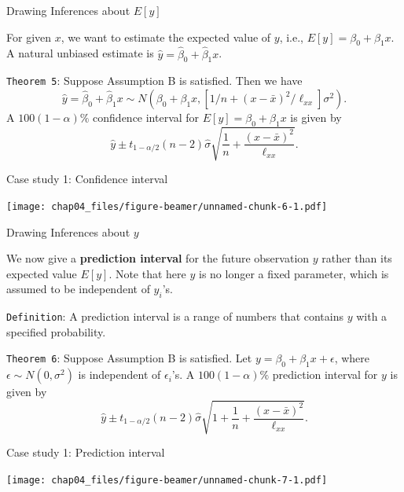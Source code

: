 \documentclass[ignorenonframetext,]{beamer}
\begin{document}
\begin{frame}[fragile]{Drawing Inferences about \(E[y]\)}
\protect\hypertarget{drawing-inferences-about-ey}{}

For given \(x\), we want to estimate the expected value of \(y\), i.e.,
\(E[y]=\beta_0+\beta_1x.\) A natural unbiased estimate is
\(\hat y = \hat\beta_0+\hat\beta_1x\).

\texttt{Theorem\ 5}: Suppose Assumption B is satisfied. Then we have
\[\hat y = \hat\beta_0+\hat\beta_1x \sim N(\beta_0+\beta_1x,[1/n+(x-\bar x)^2/\ell_{xx}]\sigma^2).\]
A \(100(1−\alpha)\%\) confidence interval for \(E[y]=\beta_0+\beta_1x\)
is given by
\[\hat y\pm t_{1-\alpha/2}(n-2)\hat{\sigma}\sqrt{\frac{1}{n}+\frac{(x-\bar x)^2}{\ell_{xx}}}.\]

\end{frame}

\begin{frame}{Case study 1: Confidence interval}
\protect\hypertarget{case-study-1-confidence-interval}{}

\texttt{[image: chap04\_files/figure-beamer/unnamed-chunk-6-1.pdf]}

\end{frame}

\begin{frame}[fragile]{Drawing Inferences about \(y\)}
\protect\hypertarget{drawing-inferences-about-y}{}

We now give a \textbf{prediction interval} for the future observation
\(y\) rather than its expected value \(E[y]\). Note that here \(y\) is
no longer a fixed parameter, which is assumed to be independent of
\(y_i\)'s.

\texttt{Definition}: A prediction interval is a range of numbers that
contains \(y\) with a specified probability.

\texttt{Theorem\ 6}: Suppose Assumption B is satisfied. Let
\(y=\beta_0+\beta_1x+\epsilon\), where \(\epsilon\sim N(0,\sigma^2)\) is
independent of \(\epsilon_i\)'s. A \(100(1−\alpha)\%\) prediction
interval for \(y\) is given by
\[\hat y\pm t_{1-\alpha/2}(n-2)\hat{\sigma}\sqrt{1+\frac{1}{n}+\frac{(x-\bar x)^2}{\ell_{xx}}}.\]

\end{frame}

\begin{frame}{Case study 1: Prediction interval}
\protect\hypertarget{case-study-1-prediction-interval}{}

\texttt{[image: chap04\_files/figure-beamer/unnamed-chunk-7-1.pdf]}

\end{frame}
\end{document}
